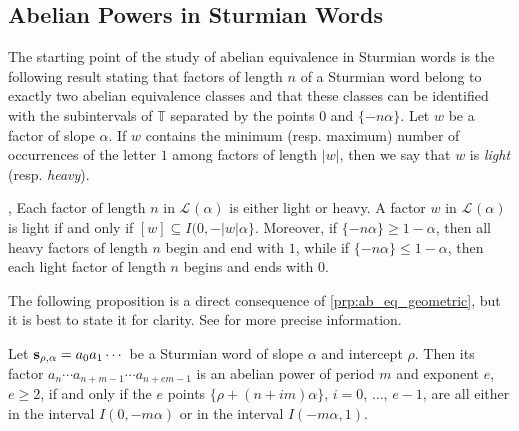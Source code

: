\documentclass[a4paper,fleqn]{article}
\providecommand{\abs}[1]{\lvert#1\rvert}
\newcommand{\Lang}[2][]{\mathcal{L}_{#1}(#2)}
\newcommand{\infw}[1]{%
  \ifcat\noexpand#1\relax\bm{#1}%
  \else\mathbf{#1}\fi}          %
\newcommand{\T}{\mathbb{T}}
\begin{document}
  \subsection{Abelian Powers in Sturmian Words}
  The starting point of the study of abelian equivalence in Sturmian words is the following result stating that factors
  of length $n$ of a Sturmian word belong to exactly two abelian equivalence classes and that these classes can be
  identified with the subintervals of $\T$ separated by the points $0$ and $\{-n\alpha\}$. Let $w$ be a factor of slope
  $\alpha$. If $w$ contains the minimum (resp. maximum) number of occurrences of the letter $1$ among factors of length
  $\abs{w}$, then we say that $w$ is \emph{light} (resp. \emph{heavy}).

  \begin{proposition}\label{prp:ab_eq_geometric}
    \cite[Prop.~3.3]{2016:abelian_powers_and_repetitions_in_sturmian_words},
    \cite[Thm.~19]{2013:some_properties_of_abelian_return_words}
    Each factor of length $n$ in $\Lang{\alpha}$ is either light or heavy. A factor $w$ in $\Lang{\alpha}$ is light if
    and only if $[w] \subseteq I(0, -\abs{w}\alpha\}$. Moreover, if $\{-n\alpha\} \geq 1 - \alpha$, then all heavy
    factors of length $n$ begin and end with $1$, while if $\{-n\alpha\} \leq 1 - \alpha$, then each light factor of
    length $n$ begins and ends with $0$.
  \end{proposition}

  The following proposition is a direct consequence of \autoref{prp:ab_eq_geometric}, but it is best to state it for
  clarity. See \cite[Lemma~4.2]{2016:abelian_powers_and_repetitions_in_sturmian_words} for more precise information.

  \begin{proposition}\label{prp:ab_eq_geometric_2}
    Let $\infw{s}_{\rho,\alpha} = a_0 a_1 \dotsm$ be a Sturmian word of slope $\alpha$ and intercept $\rho$. Then its
    factor $a_n \dotsm a_{n+m-1} \dotsm a_{n+em-1}$ is an abelian power of period $m$ and exponent $e$, $e \geq 2$, if
    and only if the $e$ points $\{\rho + (n + im)\alpha\}$, $i = 0$, $\ldots$, $e - 1$, are all either in the interval
    $I(0, -m\alpha)$ or in the interval $I(-m\alpha, 1)$.
  \end{proposition}
\end{document}
